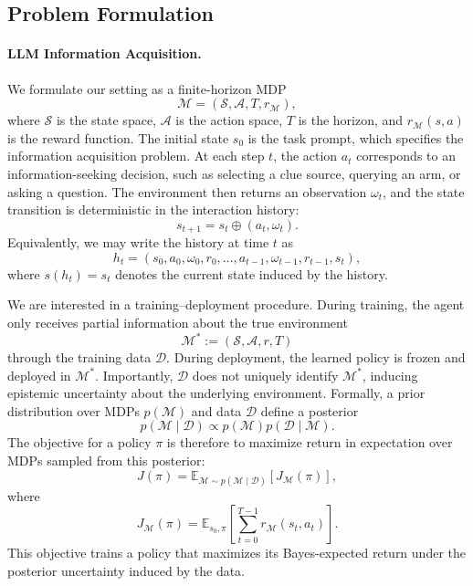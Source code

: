 \documentclass[11pt]{article}
\theoremstyle{plain}
\theoremstyle{definition}
\theoremstyle{remark}
\begin{document}
\subsection{Problem Formulation}

\paragraph{LLM Information Acquisition.}
We formulate our setting as a finite-horizon MDP
\[
\mathcal{M} = (\mathcal{S}, \mathcal{A}, T, r_{\mathcal{M}}),
\]
where $\mathcal{S}$ is the state space, $\mathcal{A}$ is the action space,
$T$ is the horizon, and $r_{\mathcal{M}}(s,a)$ is the reward function.
The initial state $s_0$ is the task prompt, which specifies the information
acquisition problem. At each step $t$, the action $a_t$ corresponds to an
information-seeking decision, such as selecting a clue source, querying an
arm, or asking a question. The environment then returns an observation
$\omega_t$, and the state transition is deterministic in the interaction
history:
\[
s_{t+1} = s_t \oplus (a_t,\omega_t).
\]
Equivalently, we may write the history at time $t$ as
\[
h_t = (s_0,a_0,\omega_0,r_0,\ldots,a_{t-1},\omega_{t-1},r_{t-1},s_t),
\]
where $s(h_t)=s_t$ denotes the current state induced by the history.

We are interested in a training--deployment procedure. During training, the
agent only receives partial information about the true environment
\[
\mathcal{M}^* := (\mathcal{S},\mathcal{A},r,T)
\]
through the training data $\mathcal{D}$. During deployment, the learned policy
is frozen and deployed in $\mathcal{M}^*$. Importantly, $\mathcal{D}$ does not
uniquely identify $\mathcal{M}^*$, inducing epistemic uncertainty about the
underlying environment. Formally, a prior distribution over MDPs $p(\mathcal{M})$
and data $\mathcal{D}$ define a posterior
\[
p(\mathcal{M}\mid \mathcal{D})
\propto
p(\mathcal{M})p(\mathcal{D}\mid \mathcal{M}).
\]
The objective for a policy $\pi$ is therefore to maximize return in expectation
over MDPs sampled from this posterior:
\[
J(\pi)
=
\mathbb{E}_{\mathcal{M}\sim p(\mathcal{M}\mid \mathcal{D})}
\left[
J_{\mathcal{M}}(\pi)
\right],
\]
where
\[
J_{\mathcal{M}}(\pi)
=
\mathbb{E}_{s_0,\pi}
\left[
\sum_{t=0}^{T-1}
r_{\mathcal{M}}(s_t,a_t)
\right].
\]
This objective trains a policy that maximizes its Bayes-expected return under
the posterior uncertainty induced by the data.
\end{document}
